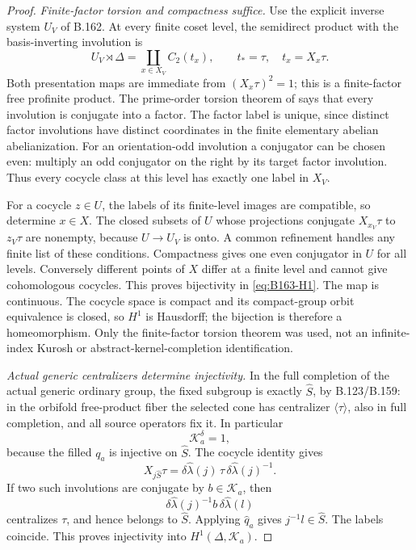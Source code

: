 \begin{proof}
\emph{Finite-factor torsion and compactness suffice.}
Use the explicit inverse system $U_V$ of B.162. At every finite coset
level, the semidirect product with the basis-inverting involution is
\[
 U_V\rtimes\Delta=\coprod_{x\in X_V}C_2(t_x),\qquad
 t_*=\tau,\quad t_x=X_x\tau.
\]
Both presentation maps are immediate from $(X_x\tau)^2=1$; this is
a finite-factor free profinite product. The prime-order torsion theorem
of \citet[Theorem A\(^{\prime}\)]{A_HR1985} says that every involution
is conjugate into a factor. The factor label is unique, since distinct
factor involutions have distinct coordinates in the finite elementary
abelian abelianization. For an orientation-odd involution a conjugator
can be chosen even: multiply an odd conjugator on the right by its
target factor involution. Thus every cocycle class at this level has
exactly one label in $X_V$.

For a cocycle $z\in U$, the labels of its finite-level images are
compatible, so determine $x\in X$. The closed subsets of $U$ whose
projections conjugate $X_{x_V}\tau$ to $z_V\tau$ are nonempty, because
$U\to U_V$ is onto. A common refinement handles any finite list of
these conditions. Compactness gives one even conjugator in $U$ for
all levels. Conversely different points of $X$ differ at a finite
level and cannot give cohomologous cocycles. This proves bijectivity
in \eqref{eq:B163-H1}. The map is continuous. The cocycle space is
compact and its compact-group orbit equivalence is closed, so $H^1$
is Hausdorff; the bijection is therefore a homeomorphism. Only the
finite-factor torsion theorem was used, not an infinite-index Kurosh
or abstract-kernel-completion identification.

\emph{Actual generic centralizers determine injectivity.}
In the full completion of the actual generic ordinary group, the fixed
subgroup is exactly $\widehat S$, by
B.123/B.159: in the orbifold free-product fiber the selected cone has
centralizer $\langle\tau\rangle$, also in full completion, and all
source operators fix it. In particular
\[
 \mathcal K_a^\delta=1,
\]
because the filled $q_a$ is injective on $\widehat S$.
The cocycle identity gives
\[
 X_{j\widehat S}\tau
   =\delta\widehat\lambda(j)\,\tau\,
                   \delta\widehat\lambda(j)^{-1}.
\]
If two such involutions are conjugate by $b\in\mathcal K_a$, then
\[
 \delta\widehat\lambda(j)^{-1}b\,
                   \delta\widehat\lambda(l)
\]
centralizes $\tau$, and hence belongs to $\widehat S$. Applying
$\widehat q_a$ gives $j^{-1}l\in\widehat S$. The labels coincide.
This proves injectivity into $H^1(\Delta,\mathcal K_a)$.


\end{proof}

